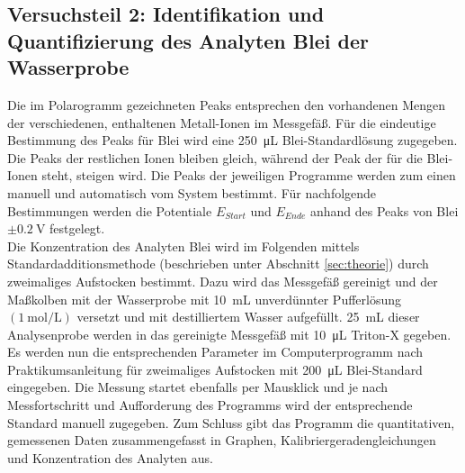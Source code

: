 \subsection{Versuchsteil 2: Identifikation und Quantifizierung des Analyten Blei der Wasserprobe}
Die im Polarogramm gezeichneten Peaks entsprechen den vorhandenen Mengen der verschiedenen, enthaltenen Metall-Ionen im Messgefäß. Für die eindeutige Bestimmung des Peaks für Blei wird eine \SI{250}{\micro \liter} Blei-Standardlösung zugegeben. Die Peaks der restlichen Ionen bleiben gleich, während der Peak der für die Blei-Ionen steht, steigen wird. Die Peaks der jeweiligen Programme werden zum einen manuell und automatisch vom System bestimmt. Für nachfolgende Bestimmungen werden die Potentiale $E_{Start}$ und $E_{Ende}$ anhand des Peaks von Blei $\pm \SI{0,2}{\volt}$ festgelegt.\\
Die Konzentration des Analyten Blei wird im Folgenden mittels Standardadditionsmethode (beschrieben unter Abschnitt \ref{sec:theorie}) durch zweimaliges Aufstocken bestimmt.\linebreak
Dazu wird das Messgefäß gereinigt und der Maßkolben mit der Wasserprobe mit \SI{10}{\milli \liter} unverdünnter Pufferlösung $\left(\SI{1}{\mol\per\liter}\right)$ versetzt und mit destilliertem Wasser aufgefüllt. \SI{25}{\milli \liter} dieser Analysenprobe werden in das gereinigte Messgefäß mit \SI{10}{\micro\liter} Triton-X gegeben. Es werden nun die entsprechenden Parameter im Computerprogramm nach Praktikumsanleitung für zweimaliges Aufstocken mit \SI{200}{\micro\liter} Blei-Standard eingegeben. 
Die Messung startet ebenfalls per Mausklick und je nach Messfortschritt und Aufforderung des Programms wird der entsprechende Standard manuell zugegeben. Zum Schluss gibt das Programm die quantitativen, gemessenen Daten zusammengefasst in Graphen, Kalibriergeradengleichungen und Konzentration des Analyten aus.

\newpage
